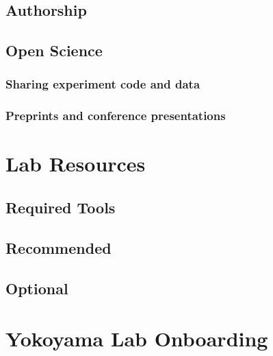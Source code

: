 \documentclass[
]{book}
\begin{document}
\hypertarget{authorship}{%
\section{Authorship}\label{authorship}}

\hypertarget{open-science}{%
\section{Open Science}\label{open-science}}

\hypertarget{sharing-experiment-code-and-data}{%
\subsection{Sharing experiment code and data}\label{sharing-experiment-code-and-data}}

\hypertarget{preprints-and-conference-presentations}{%
\subsection{Preprints and conference presentations}\label{preprints-and-conference-presentations}}

\hypertarget{lab-resources}{%
\chapter{Lab Resources}\label{lab-resources}}

\hypertarget{required-tools}{%
\section{Required Tools}\label{required-tools}}

\hypertarget{recommended}{%
\section{Recommended}\label{recommended}}

\hypertarget{optional}{%
\section{Optional}\label{optional}}

\hypertarget{getting-started}{%
\chapter{Yokoyama Lab Onboarding}\label{getting-started}}
\end{document}

